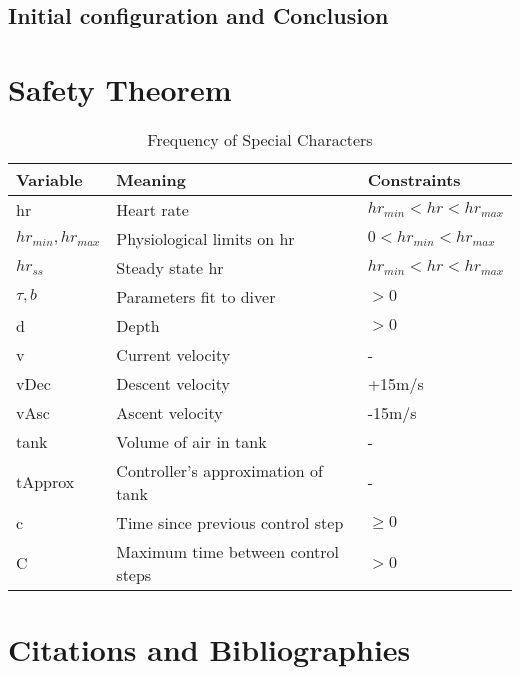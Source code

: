 \documentclass[sigconf,screen]{acmart}
\begin{document}
\subsection{Initial configuration and Conclusion}

\section{Safety Theorem}

\begin{table*}
  \caption{Frequency of Special Characters}
  \label{tab:vars}
  \begin{tabular}{lll}
    \toprule
    Variable & Meaning & Constraints\\
    \midrule
    hr & Heart rate & $hr_{min}<hr<hr_{max}$\\
    $hr_{min}, hr_{max}$ & Physiological limits on hr & $0<hr_{min}<hr_{max}$\\
    $hr_{ss}$ & Steady state hr & $hr_{min}<hr<hr_{max}$\\
    $\tau,b$ & Parameters fit to diver& $>0$\\ \hline
    d & Depth & $>0$\\
    v & Current velocity & - \\
    vDec& Descent velocity & +15m/s\\ 
    vAsc & Ascent velocity & -15m/s\\ \hline 
    tank & Volume of air in tank & - \\
    tApprox & Controller's approximation of tank & - \\ \hline
    c & Time since previous control step & $\geq0$\\
    C & Maximum time between control steps & $>0$\\ 
  \bottomrule
\end{tabular}
\end{table*}

\section{Citations and Bibliographies}

%
\end{document}
